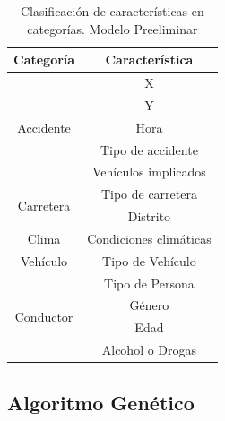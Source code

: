


\begin{table}[H]
	\centering
	
	\begin{tabular}{ |c|c| }
		\hline
		\textbf{Categoría} & \textbf{Característica} \\
		\hline
		\hline
		\multirow{5}{*}{Accidente} & X \\
		& Y \\
		& Hora \\
		& Tipo de accidente \\
		& Vehículos implicados \\
		\hline
		\hline
		\multirow{2}{*}{Carretera} & Tipo de carretera \\
		& Distrito \\
		\hline
		\hline
		Clima & Condiciones climáticas \\
		\hline
		\hline
		Vehículo & Tipo de Vehículo \\
		\hline
		\hline
		\multirow{4}{*}{Conductor}  & Tipo de Persona \\
		& Género \\
		& Edad \\
		& Alcohol o Drogas \\
		\hline
		\hline
	\end{tabular}
	
	\caption{Clasificación de características en categorías. Modelo Preeliminar}
	\label{JC}
\end{table}



\subsection*{Algoritmo Genético}



